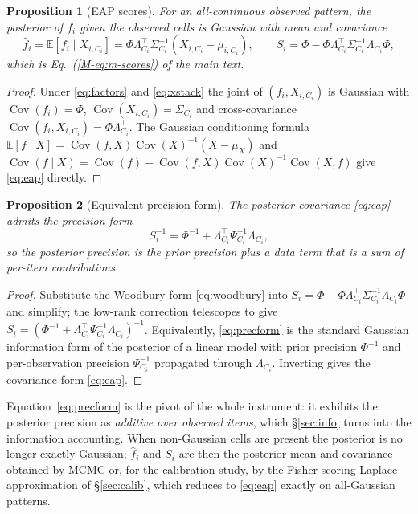 \documentclass[11pt]{article}
\newcommand{\eED}{\mathbb{E}}
\theoremstyle{plain}
\newtheorem{proposition}{Proposition}
\theoremstyle{definition}
\newcommand{\MEq}[1]{Eq.~(\ref{M-#1})}
\begin{document}
\begin{proposition}[EAP scores]\label{prop:eap}
For an all-continuous observed pattern, the posterior of $f_i$ given the observed cells is
Gaussian with mean and covariance
\begin{equation}
  \hat f_i=\eED[f_i\mid X_{i,C_i}]
  =\Phi\Lambda_{C_i}^{\top}\Sigma_{C_i}^{-1}\!\left(X_{i,C_i}-\mu_{i,C_i}\right),\qquad
  S_i=\Phi-\Phi\Lambda_{C_i}^{\top}\Sigma_{C_i}^{-1}\Lambda_{C_i}\Phi ,
  \label{eq:eap}
\end{equation}
which is \MEq{eq:m-scores} of the main text.
\end{proposition}
\begin{proof}
Under \eqref{eq:factors} and \eqref{eq:xstack} the joint of $(f_i,X_{i,C_i})$ is Gaussian
with $\operatorname{Cov}(f_i)=\Phi$,
$\operatorname{Cov}(X_{i,C_i})=\Sigma_{C_i}$ and cross-covariance
$\operatorname{Cov}(f_i,X_{i,C_i})=\Phi\Lambda_{C_i}^{\top}$. The Gaussian conditioning
formula $\eED[f\mid X]=\operatorname{Cov}(f,X)\operatorname{Cov}(X)^{-1}(X-\mu_X)$ and
$\operatorname{Cov}(f\mid X)=\operatorname{Cov}(f)-\operatorname{Cov}(f,X)
\operatorname{Cov}(X)^{-1}\operatorname{Cov}(X,f)$ give \eqref{eq:eap} directly.
\end{proof}

\begin{proposition}[Equivalent precision form]\label{prop:precform}
The posterior covariance \eqref{eq:eap} admits the precision form
\begin{equation}
  S_i^{-1}=\Phi^{-1}+\Lambda_{C_i}^{\top}\Psi_{C_i}^{-1}\Lambda_{C_i},
  \label{eq:precform}
\end{equation}
so the posterior precision is the prior precision plus a data term that is a sum of
per-item contributions.
\end{proposition}
\begin{proof}
Substitute the Woodbury form \eqref{eq:woodbury} into
$S_i=\Phi-\Phi\Lambda_{C_i}^{\top}\Sigma_{C_i}^{-1}\Lambda_{C_i}\Phi$ and simplify; the
low-rank correction telescopes to give $S_i=(\Phi^{-1}+\Lambda_{C_i}^{\top}\Psi_{C_i}^{-1}
\Lambda_{C_i})^{-1}$. Equivalently, \eqref{eq:precform} is the standard Gaussian
information form of the posterior of a linear model with prior precision $\Phi^{-1}$ and
per-observation precision $\Psi_{C_i}^{-1}$ propagated through $\Lambda_{C_i}$. Inverting
gives the covariance form \eqref{eq:eap}.
\end{proof}
\noindent
Equation~\eqref{eq:precform} is the pivot of the whole instrument: it exhibits the posterior
precision as \emph{additive over observed items}, which \S\ref{sec:info} turns into the
information accounting. When non-Gaussian cells are present the posterior is no longer exactly
Gaussian; $\hat f_i$ and $S_i$ are then the posterior mean and covariance obtained by MCMC or,
for the calibration study, by the Fisher-scoring Laplace approximation of \S\ref{sec:calib},
which reduces to \eqref{eq:eap} exactly on all-Gaussian patterns.
\end{document}
